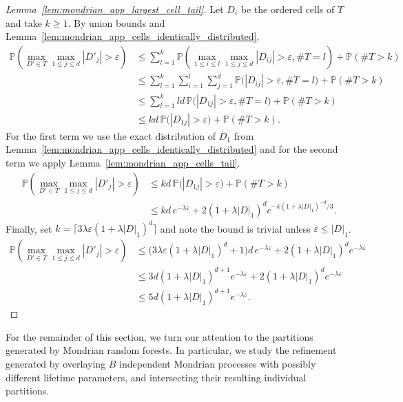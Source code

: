 \documentclass[11pt,lof]{puthesis}
\renewcommand{\P}{\ensuremath{\mathbb{P}}}
\theoremstyle{break}
\theoremstyle{proof}
\newtheorem{proof}{Proof}
\begin{document}
\begin{proof}[Lemma~\ref{lem:mondrian_app_largest_cell_tail}]

Let $D_i$ be the ordered cells of $T$ and take $k \geq 1$.
By union bounds and
Lemma~\ref{lem:mondrian_app_cells_identically_distributed},
%
\begin{align*}
\P\left(
\max_{D' \in T}
\max_{1 \leq j \leq d}
|D'_j| > \varepsilon
\right)
&\leq
\sum_{l=1}^k
\P\left(
\max_{1 \leq i \leq l}
\max_{1 \leq j \leq d}
|D_{i j}| > \varepsilon,
\# T = l
\right)
+ \P\left( \# T > k \right) \\
&\leq
\sum_{l=1}^k
\sum_{i=1}^l
\sum_{j=1}^d
\P\big(
|D_{i j}| > \varepsilon,
\# T = l
\big)
+ \P\left( \# T > k \right) \\
&\leq
\sum_{l=1}^k
l d \,
\P\big(
|D_{1j}| > \varepsilon,
\# T = l
\big)
+ \P\left( \# T > k \right) \\
&\leq
k d \,
\P\big(|D_{1 j}| > \varepsilon \big)
+ \P\left( \# T > k \right).
\end{align*}
%
For the first term we use the exact distribution of
$D_1$ from Lemma~\ref{lem:mondrian_app_cells_identically_distributed}
and for the second term we apply Lemma~\ref{lem:mondrian_app_cells_tail}.
%
\begin{align*}
\P\left(
\max_{D' \in T}
\max_{1 \leq j \leq d}
|D'_j| > \varepsilon
\right)
&\leq
k d \, \P\big(|D_{1 j}| > \varepsilon \big)
+ \P\left( \# T > k \right) \\
&\leq
k d \, e^{-\lambda \varepsilon}
+ 2 (1 + \lambda |D|_1)^d
e^{-k (1 + \lambda |D|_1)^{-d} / 3}.
\end{align*}
%
Finally, set
$k = \big\lceil 3 \lambda \varepsilon (1 + \lambda |D|_1)^d \big\rceil$
and note the bound is trivial unless $\varepsilon \leq |D|_1$.
%
\begin{align*}
\P\left(
\max_{D' \in T}
\max_{1 \leq j \leq d}
|D'_j| > \varepsilon
\right)
&\leq
\big( 3 \lambda \varepsilon (1 + \lambda |D|_1)^d + 1 \big)
d \, e^{-\lambda \varepsilon}
+ 2 (1 + \lambda |D|_1)^d
e^{-\lambda \varepsilon} \\
&\leq
3d (1 + \lambda |D|_1)^{d+1}
e^{-\lambda \varepsilon}
+ 2 (1 + \lambda |D|_1)^d
e^{-\lambda \varepsilon} \\
&\leq
5d (1 + \lambda |D|_1)^{d+1}
e^{-\lambda \varepsilon}.
\end{align*}
%
\end{proof}

For the remainder of this section, we turn our attention to the partitions
generated by Mondrian random forests. In particular, we study the refinement
generated by overlaying $B$ independent Mondrian processes with possibly
different lifetime parameters, and intersecting their resulting individual
partitions.
\end{document}
